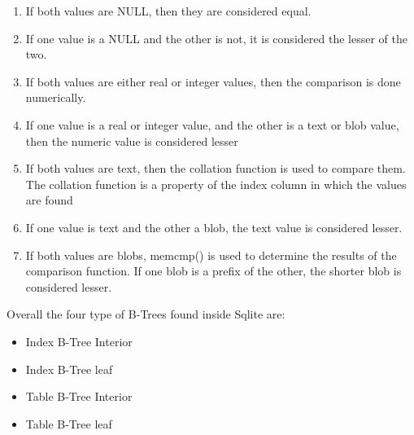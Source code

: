 \begin{enumerate} 
	\item If both values are NULL, then they are considered equal.
	\item If one value is a NULL and the other is not, it is considered the lesser of the two.
	\item If both values are either real or integer values, then the comparison is done numerically.
	\item If one value is a real or integer value, and the other is a text or blob value, then the numeric value is considered lesser
	\item If both values are text, then the collation function is used to compare them. The collation function is a property of the index column in which the values are found
	\item If one value is text and the other a blob, the text value is considered lesser.
	\item If both values are blobs, memcmp() is used to determine the results of the comparison function. If one blob is a prefix of the other, the shorter blob is considered lesser. \\
\end{enumerate}
  
Overall the four type of B-Trees found inside Sqlite are:

\begin{itemize} 
	\item Index B-Tree Interior
	\item Index B-Tree leaf
	\item Table B-Tree Interior
	\item Table B-Tree leaf 
\end{itemize} 


